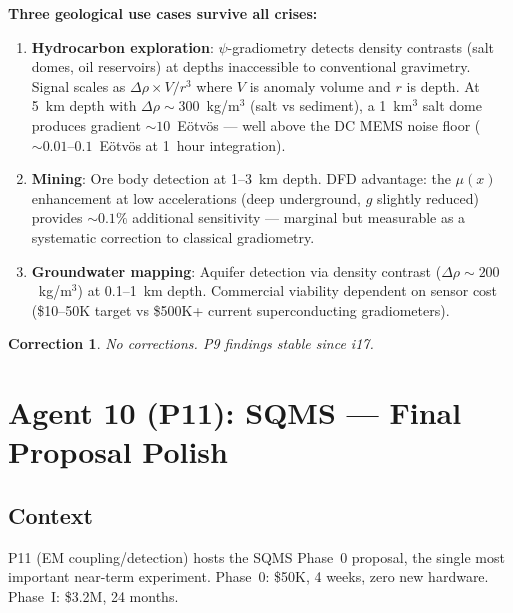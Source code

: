 \documentclass[11pt]{article}
\newtheorem{correction}[theorem]{Correction}
\theoremstyle{remark}
\begin{document}
\begin{newbox}
\textbf{Three geological use cases survive all crises:}
\begin{enumerate}
\item \textbf{Hydrocarbon exploration}: $\psi$-gradiometry detects density contrasts
  (salt domes, oil reservoirs) at depths inaccessible to conventional gravimetry.
  Signal scales as $\Delta\rho \times V / r^3$ where $V$ is anomaly volume and $r$
  is depth. At 5~km depth with $\Delta\rho \sim 300$~kg/m$^3$ (salt vs sediment),
  a 1~km$^3$ salt dome produces gradient $\sim 10$~E\"{o}tv\"{o}s --- well above the
  DC MEMS noise floor ($\sim 0.01$--$0.1$~E\"{o}tv\"{o}s at 1~hour integration).
\item \textbf{Mining}: Ore body detection at 1--3~km depth. DFD advantage: the
  $\mu(x)$ enhancement at low accelerations (deep underground, $g$ slightly reduced)
  provides $\sim 0.1\%$ additional sensitivity --- marginal but measurable as a
  systematic correction to classical gradiometry.
\item \textbf{Groundwater mapping}: Aquifer detection via density contrast ($\Delta\rho
  \sim 200$~kg/m$^3$) at 0.1--1~km depth. Commercial viability dependent on sensor
  cost (\$10--50K target vs \$500K+ current superconducting gradiometers).
\end{enumerate}
\end{newbox}

\begin{correction}
No corrections. P9 findings stable since i17.
\end{correction}

\newpage
\section{Agent 10 (P11): SQMS --- Final Proposal Polish}
\label{sec:agent10}

\subsection{Context}
P11 (EM coupling/detection) hosts the SQMS Phase~0 proposal, the single most important
near-term experiment. Phase~0: \$50K, 4 weeks, zero new hardware. Phase~I: \$3.2M,
24 months.
\end{document}
